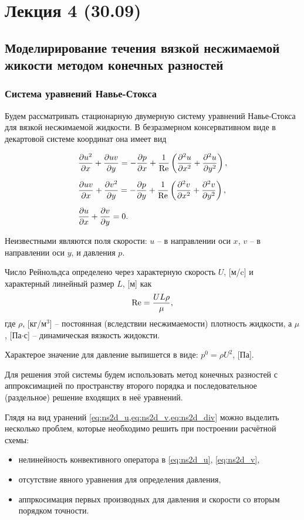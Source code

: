 \section{Лекция 4 (30.09)}

\subsection{Моделирирование течения вязкой несжимаемой жикости методом конечных разностей}
\subsubsection{Система уравнений Навье-Стокса}

Будем рассматривать стационарную двумерную систему уравнений
Навье-Стокса для вязкой несжимаемой жидкости.
В безразмерном консервативном виде в декартовой системе координат она имеет вид

\begin{align}
    \label{eq:ns2d_u}
    & \frac{\partial u^2}{\partial x} + \frac{\partial uv}{\partial y} =
        -\frac{\partial p}{\partial x}
        + \frac{1}{\mathrm{Re}}\left(\frac{\partial^2 u}{\partial x^2} + \frac{\partial^2 u}{\partial y^2}\right),\\[5pt]
    \label{eq:ns2d_v}
    & \frac{\partial uv}{\partial x} + \frac{\partial v^2}{\partial y} =
        -\frac{\partial p}{\partial y}
        + \frac{1}{\mathrm{Re}}\left(\frac{\partial^2 v}{\partial x^2} + \frac{\partial^2 v}{\partial y^2}\right), \\[5pt]
    \label{eq:ns2d_div}
    &\frac{\partial u}{\partial x} + \frac{\partial v}{\partial y} = 0.
\end{align}

Неизвестными являются поля скорости: $u$ -- в направлении оси $x$,
$v$ -- в направлении оси $y$, и давления $p$.

Число Рейнольдса определено через характерную скорость $U$, [м/c] и
характерный линейный размер $L$, [м] как
\begin{equation*}
    \mathrm{Re} = \frac{UL\rho}{\mu},
\end{equation*}
где $\rho$, [кг/м$^3$] -- постоянная (вследствии несжимаемости) плотность жидкости, а
$\mu$, [Па$\cdot$с] -- динамическая вязкость жидоксти.

Характерое значение для давление выпишется в виде:
$ p^0 = \rho U^2 $, [Па].

Для решения этой системы будем использовать метод конечных разностей
с аппроксимацией по пространству второго порядка и последовательное (раздельное) решение входящих в неё
уравнений.

Глядя на вид уранений \cref{eq:ns2d_u,eq:ns2d_v,eq:ns2d_div}
можно выделить несколько проблем, которые необходимо решить
при построении расчётной схемы:
\begin{itemize}
\item нелинейность конвективного оператора в \eqref{eq:ns2d_u}, \eqref{eq:ns2d_v},
\item отсутствие явного уравнения для определения давления,
\item аппркосимация первых производных для давления и скорости со вторым порядком точности.
\end{itemize}


